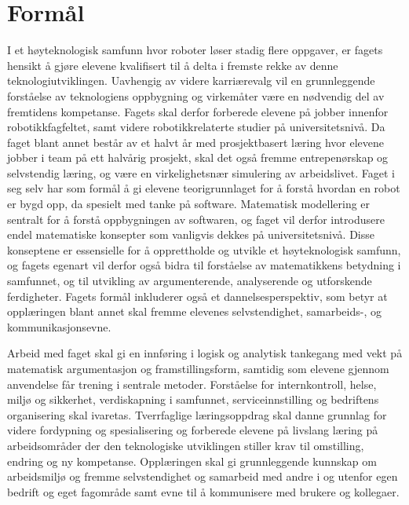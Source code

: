 \section*{Formål} \label{Sec: Formaal}

	I et høyteknologisk samfunn hvor roboter løser stadig flere oppgaver, er fagets hensikt å gjøre elevene kvalifisert til å delta i fremste rekke av denne teknologiutviklingen.
	Uavhengig av videre karriærevalg vil en grunnleggende forståelse av teknologiens oppbygning og virkemåter være en nødvendig del av fremtidens kompetanse.
	Fagets skal derfor forberede elevene på jobber innenfor robotikkfagfeltet, samt videre robotikkrelaterte studier på universitetsnivå.
	Da faget blant annet består av et halvt år med prosjektbasert læring hvor elevene jobber i team på ett halvårig prosjekt, skal det også fremme entrepenørskap og selvstendig læring, og være en virkelighetsnær simulering av arbeidslivet.
	Faget i seg selv har som formål å gi elevene teorigrunnlaget for å forstå hvordan en robot er bygd opp, da spesielt med tanke på software.
	Matematisk modellering er sentralt for å forstå oppbygningen av softwaren, og faget vil derfor introdusere endel matematiske konsepter som vanligvis dekkes på universitetsnivå.
	Disse konseptene er essensielle for å opprettholde og utvikle et høyteknologisk samfunn, og fagets egenart vil derfor også bidra til forståelse av matematikkens betydning i samfunnet, og til utvikling av argumenterende, analyserende og utforskende ferdigheter.
	Fagets formål inkluderer også et dannelsesperspektiv, som betyr at opplæringen blant annet skal fremme elevenes selvstendighet, samarbeids-, og kommunikasjonsevne.

\iffalse

	Arbeid med faget skal gi en innføring i logisk og analytisk tankegang med vekt på matematisk argumentasjon og framstillingsform, samtidig som elevene gjennom anvendelse får trening i sentrale metoder.
	Forståelse for internkontroll, helse, miljø og sikkerhet, verdiskapning i samfunnet, serviceinnstilling og bedriftens organisering skal ivaretas.
	Tverrfaglige læringsoppdrag skal danne grunnlag for videre fordypning og spesialisering og forberede elevene på livslang læring på arbeidsområder der den teknologiske utviklingen stiller krav til omstilling, endring og ny kompetanse.
	Opplæringen skal gi grunnleggende kunnskap om arbeidsmiljø og fremme selvstendighet og samarbeid med andre i og utenfor egen bedrift og eget fagområde samt evne til å kommunisere med brukere og kollegaer.



